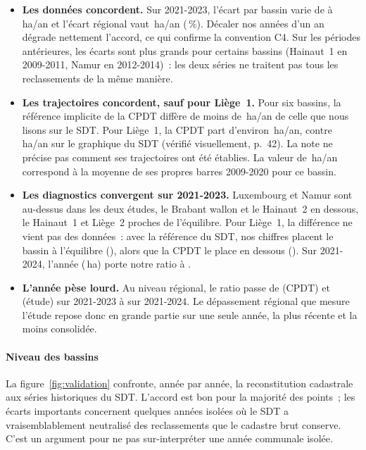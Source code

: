\documentclass[11pt,a4paper]{report}
\newcommand{\ha}{\,ha}
\newcommand{\haan}{\,ha/an}
\begin{document}
\begin{itemize}
\item \textbf{Les données concordent.} Sur 2021-2023, l'écart par bassin varie de \CpdtEcartMin{} à \CpdtEcartMax\haan{} et l'écart régional vaut \CpdtEcartWal\haan{} (\CpdtEcartPct\,\%). Décaler nos années d'un an dégrade nettement l'accord, ce qui confirme la convention C4. Sur les périodes antérieures, les écarts sont plus grands pour certains bassins (Hainaut~1 en 2009-2011, Namur en 2012-2014)~: les deux séries ne traitent pas tous les reclassements de la même manière.
\item \textbf{Les trajectoires concordent, sauf pour Liège~1.} Pour six bassins, la référence implicite de la CPDT diffère de moins de \CpdtRefEcartAutres\haan{} de celle que nous lisons sur le SDT. Pour Liège~1, la CPDT part d'environ \LUnRefCpdt\haan, contre \LUnRef\haan{} sur le graphique du SDT (vérifié visuellement, p.~42). La note ne précise pas comment ses trajectoires ont été établies. La valeur de \LUnRefCpdt\haan{} correspond à la moyenne de ses propres barres 2009-2020 pour ce bassin.
\item \textbf{Les diagnostics convergent sur 2021-2023.} Luxembourg et Namur sont au-dessus dans les deux études, le Brabant wallon et le Hainaut~2 en dessous, le Hainaut~1 et Liège~2 proches de l'équilibre. Pour Liège~1, la différence ne vient pas des données~: avec la référence du SDT, nos chiffres placent le bassin à l'équilibre (\LUnRatioTrois), alors que la CPDT le place en dessous (\CpdtRatioLUn). Sur 2021-2024, l'année \AnneeFinObs{} (\LUnObsFin\ha) porte notre ratio à \LUnRatio.
\item \textbf{L'année \AnneeFinObs{} pèse lourd.} Au niveau régional, le ratio passe de \CpdtRatioWal{} (CPDT) et \EtudeRatioTroisWal{} (étude) sur 2021-2023 à \WalRatio{} sur 2021-2024. Le dépassement régional que mesure l'étude repose donc en grande partie sur une seule année, la plus récente et la moins consolidée.
\end{itemize}

\paragraph{Niveau des bassins} La figure~\ref{fig:validation} confronte, année par année, la reconstitution cadastrale aux séries historiques du SDT. L'accord est bon pour la majorité des points~; les écarts importants concernent quelques années isolées où le SDT a vraisemblablement neutralisé des reclassements que le cadastre brut conserve. C'est un argument pour ne pas sur-interpréter une année communale isolée.
\end{document}
